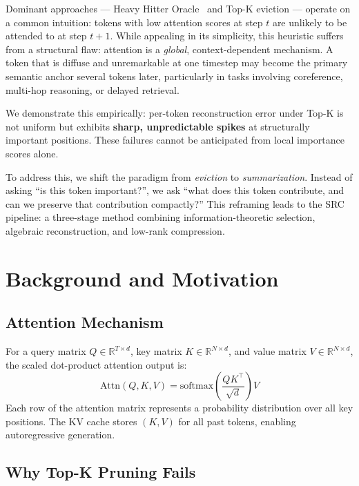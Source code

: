\documentclass[11pt,a4paper]{article}
\begin{document}
Dominant approaches --- Heavy Hitter Oracle~\citep{zhang2023h2o} and Top-K eviction --- operate on a common intuition: tokens with low attention scores at step $t$ are unlikely to be attended to at step $t+1$. While appealing in its simplicity, this heuristic suffers from a structural flaw: attention is a \emph{global}, context-dependent mechanism. A token that is diffuse and unremarkable at one timestep may become the primary semantic anchor several tokens later, particularly in tasks involving coreference, multi-hop reasoning, or delayed retrieval.

We demonstrate this empirically: per-token reconstruction error under Top-K is not uniform but exhibits \textbf{sharp, unpredictable spikes} at structurally important positions. These failures cannot be anticipated from local importance scores alone.

To address this, we shift the paradigm from \emph{eviction} to \emph{summarization}. Instead of asking ``is this token important?'', we ask ``what does this token contribute, and can we preserve that contribution compactly?'' This reframing leads to the SRC pipeline: a three-stage method combining information-theoretic selection, algebraic reconstruction, and low-rank compression.

\section{Background and Motivation}

\subsection{Attention Mechanism}

For a query matrix $Q \in \mathbb{R}^{T \times d}$, key matrix $K \in \mathbb{R}^{N \times d}$, and value matrix $V \in \mathbb{R}^{N \times d}$, the scaled dot-product attention output is:
\[
    \text{Attn}(Q, K, V) = \text{softmax}\!\left(\frac{QK^\top}{\sqrt{d}}\right) V
\]
Each row of the attention matrix represents a probability distribution over all key positions. The KV cache stores $(K, V)$ for all past tokens, enabling autoregressive generation.

\subsection{Why Top-K Pruning Fails}
\end{document}
